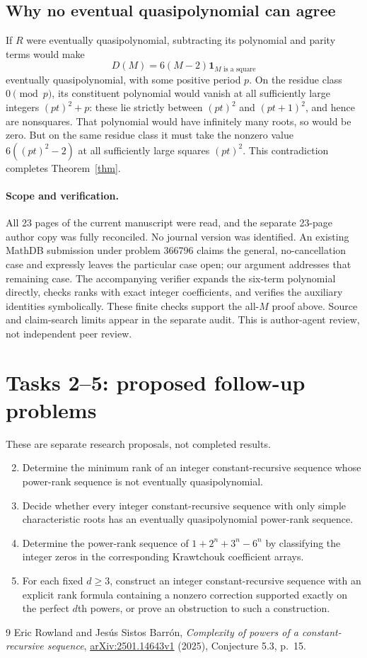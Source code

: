 \documentclass[11pt]{article}
\newcommand{\ind}{\mathbf{1}}
\begin{document}
\subsection*{Why no eventual quasipolynomial can agree}
If $R$ were eventually quasipolynomial, subtracting its polynomial
and parity terms would make
\[
D(M)=6(M-2)\ind_{M\text{ is a square}}
\]
eventually quasipolynomial, with some positive period $p$.
On the residue class $0\pmod p$, its constituent polynomial would
vanish at all sufficiently large integers $(pt)^2+p$: these lie
strictly between $(pt)^2$ and $(pt+1)^2$, and hence are nonsquares.
That polynomial would have infinitely many roots, so would be zero.
But on the same residue class it must take the nonzero value
$6((pt)^2-2)$ at all sufficiently large squares $(pt)^2$.
This contradiction completes Theorem~\ref{thm}.

\paragraph{Scope and verification.}
All 23 pages of the current manuscript were read, and the separate
23-page author copy was fully reconciled. No journal version was
identified. An existing MathDB submission under problem 366796
claims the general, no-cancellation case and expressly leaves the
particular case open; our argument addresses that remaining case.
The accompanying verifier expands the six-term polynomial directly,
checks ranks with exact integer coefficients, and verifies the
auxiliary identities symbolically. These finite checks support the
all-$M$ proof above. Source and claim-search limits appear in the
separate audit. This is author-agent review, not independent peer review.

\section*{Tasks 2--5: proposed follow-up problems}
These are separate research proposals, not completed results.
\begin{enumerate}
\setcounter{enumi}{1}
\item Determine the minimum rank of an integer constant-recursive
sequence whose power-rank sequence is not eventually quasipolynomial.
\item Decide whether every integer constant-recursive sequence with
only simple characteristic roots has an eventually quasipolynomial
power-rank sequence.
\item Determine the power-rank sequence of
$1+2^n+3^n-6^n$ by classifying the integer zeros in the corresponding
Krawtchouk coefficient arrays.
\item For each fixed $d\ge3$, construct an integer constant-recursive
sequence with an explicit rank formula containing a nonzero correction
supported exactly on the perfect $d$th powers, or prove an obstruction
to such a construction.
\end{enumerate}

\begin{thebibliography}{9}
 Eric Rowland and Jes\'us Sistos Barr\'on,
\emph{Complexity of powers of a constant-recursive sequence},
\href{https://arxiv.org/abs/2501.14643}{arXiv:2501.14643v1} (2025),
Conjecture 5.3, p.~15.
\end{thebibliography}
\end{document}
